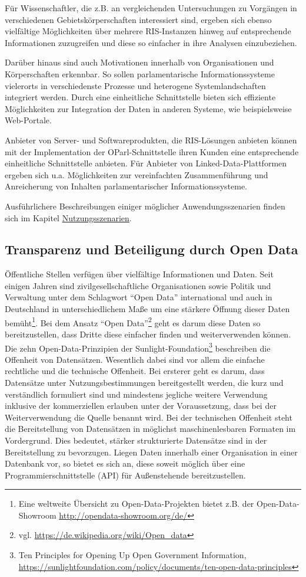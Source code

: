 \documentclass[,a4paper]{article}
\begin{document}
Für Wissenschaftler, die z.B. an vergleichenden Untersuchungen zu
Vorgängen in verschiedenen Gebietskörperschaften interessiert sind,
ergeben sich ebenso vielfältige Möglichkeiten über mehrere RIS-Instanzen
hinweg auf entsprechende Informationen zuzugreifen und diese so
einfacher in ihre Analysen einzubeziehen.

Darüber hinaus sind auch Motivationen innerhalb von Organisationen und
Körperschaften erkennbar. So sollen parlamentarische Informationssysteme
vielerorts in verschiedenste Prozesse und heterogene Systemlandschaften
integriert werden. Durch eine einheitliche Schnittstelle bieten sich
effiziente Möglichkeiten zur Integration der Daten in anderen Systeme,
wie beispielsweise Web-Portale.

Anbieter von Server- und Softwareprodukten, die RIS-Lösungen anbieten
können mit der Implementation der OParl-Schnittstelle ihren Kunden eine
entsprechende einheitliche Schnittstelle anbieten. Für Anbieter von
Linked-Data-Plattformen ergeben sich u.a. Möglichkeiten zur
vereinfachten Zusammenführung und Anreicherung von Inhalten
parlamentarischer Informationssysteme.

Ausführlichere Beschreibungen einiger möglicher Anwendungsszenarien
finden sich im Kapitel \hyperref[nutzungsszenarien]{Nutzungsszenarien}.

\subsection{Transparenz und Beteiligung durch Open
Data}\label{transparenz-und-beteiligung-durch-open-data}

Öffentliche Stellen verfügen über vielfältige Informationen und Daten.
Seit einigen Jahren sind zivilgesellschaftliche Organisationen sowie
Politik und Verwaltung unter dem Schlagwort ``Open Data'' international
und auch in Deutschland in unterschiedlichem Maße um eine stärkere
Öffnung dieser Daten bemüht\footnote{Eine weltweite Übersicht zu
  Open-Data-Projekten bietet z.B. der Open-Data-Showroom
  \url{http://opendata-showroom.org/de/}}. Bei dem Ansatz ``Open
Data''\footnote{vgl. \url{https://de.wikipedia.org/wiki/Open_data}} geht
es darum diese Daten so bereitzustellen, dass Dritte diese einfacher
finden und weiterverwenden können. Die zehn Open-Data-Prinzipien der
Sunlight-Foundation\footnote{Ten Principles for Opening Up Open
  Government Information,
  \url{https://sunlightfoundation.com/policy/documents/ten-open-data-principles}}
beschreiben die Offenheit von Datensätzen. Wesentlich dabei sind vor
allem die einfache rechtliche und die technische Offenheit. Bei ersterer
geht es darum, dass Datensätze unter Nutzungsbestimmungen bereitgestellt
werden, die kurz und verständlich formuliert sind und mindestens
jegliche weitere Verwendung inklusive der kommerziellen erlauben unter
der Voraussetzung, dass bei der Weiterverwendung die Quelle benannt
wird. Bei der technischen Offenheit steht die Bereitstellung von
Datensätzen in möglichst maschinenlesbaren Formaten im Vordergrund. Dies
bedeutet, stärker strukturierte Datensätze sind in der Bereitstellung zu
bevorzugen. Liegen Daten innerhalb einer Organisation in einer Datenbank
vor, so bietet es sich an, diese soweit möglich über eine
Programmierschnittstelle (API) für Außenstehende bereitzustellen.
\end{document}
